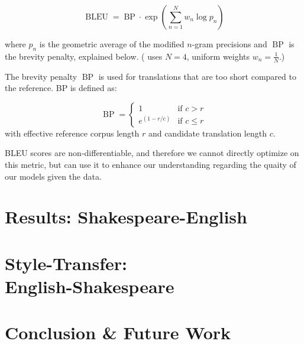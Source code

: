 \documentclass[twoside,twocolumn]{article}
\begin{document}
\begin{equation}
  \operatorname{BLEU} = \operatorname{BP} \cdot \exp \left( \sum_{n=1}^N w_n \log p_n \right)
\end{equation}

\noindent
where $p_n$ is the geometric average of the modified $n$-gram precisions
and $\operatorname{BP}$ is the brevity penalty, explained below.
(\cite{papineni2002bleu} uses $N=4$, uniform weights $w_n = \frac{1}{N}$.)

The brevity penalty $\operatorname{BP}$ is used for translations that are
too short compared to the reference. BP is defined as:

\begin{equation}
  \operatorname{BP} = \begin{cases}
    1 & \text{if } c > r \\
    e^{(1-r/c)} & \text{if } c \leq r
  \end{cases}
\end{equation}
\noindent
with effective reference corpus length $r$ and candidate translation length $c$.

BLEU scores are non-differentiable, and therefore we cannot directly optimize
on this metric, but can use it to enhance our understanding regarding the
quaity of our models given the data.

\section{Results: Shakespeare-English}
\label{sec:results}
\section{Style-Transfer:\\English-Shakespeare}
\label{sec:style-transfer}
\section{Conclusion \& Future Work}
\label{sec:conclusion}






\end{document}
